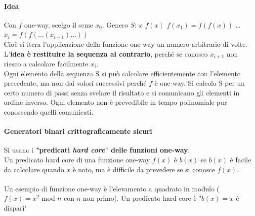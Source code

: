 \documentclass[10pt]{book}
\begin{document}
\paragraph{Idea} Con $f$ one-way, scelgo il seme $x_0$. Genero $S$: $x$ $f(x)$ $f(x_1)=f(f(x))$ \ldots $x_i = f(f(\ldots(x_{i-1})\ldots))$\\
Cioè si itera l'applicazione della funzione one-way un numero arbitrario di volte. L'\textbf{idea è restituire la sequenza al contrario}, perché se conosco $x_{i+1}$ non riesco a calcolare facilmente $x_i$.\\
Ogni elemento della sequenza S si può calcolare efficientemente con l'elemento precedente, ma non dai valori successivi perché $f$ è one-way. Si calcola S per un certo numero di passi senza svelare il risultato e si comunicano gli elementi in ordine inverso. Ogni elemento non è prevedibile in tempo polinomiale pur conoscendo quelli comunicati.
\paragraph{Generatori binari crittograficamente sicuri} Si usano i \textbf{"predicati \textit{hard core}" delle funzioni one-way}.\\
Un predicato hard core di una funzione one-way $f(x)$ è $b(x)$ se $b(x)$ è facile da calcolare quando $x$ è noto, ma è difficile da prevedere se si conosce $f(x)$.\\\\
Un esempio di funzione one-way è l'elevamento a quadrato in modulo ($f(x) = x^2$ mod $n$ con $n$ non primo). Un predicato hard core è "$b(x) = x$ è dispari"
\end{document}
